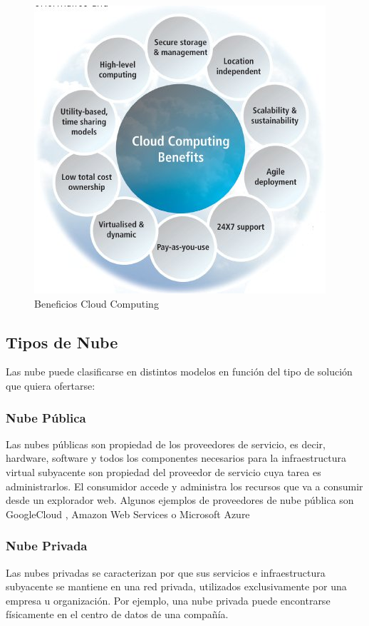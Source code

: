\documentclass[a4paper,11pt]{book}
\begin{document}
\begin{figure}[H] 
\centering 
\includegraphics[scale=0.5]{imagenes/beneficiosCC.jpg}
\caption{ Beneficios Cloud Computing\cite{beneficios} }
\end{figure}


\subsection{Tipos de Nube}

Las nube puede clasificarse en distintos modelos en función del tipo de solución que quiera ofertarse:

\subsubsection{Nube Pública}

Las nubes públicas son propiedad de los proveedores de servicio, es decir, hardware, software y todos los componentes necesarios para la infraestructura virtual subyacente son propiedad del proveedor de servicio cuya tarea es administrarlos. El consumidor accede y administra los recursos que va a consumir desde un explorador web.  Algunos ejemplos de proveedores de nube pública son GoogleCloud\cite{gcp} , Amazon Web Services\cite{aws} o Microsoft Azure\cite{azure} 
 
\subsubsection{Nube Privada}
Las nubes privadas se caracterizan por que sus servicios e infraestructura subyacente se mantiene en una red privada, utilizados exclusivamente por una empresa u organización. Por ejemplo, una nube privada puede encontrarse físicamente en el centro de datos de una compañía.  
\end{document}
